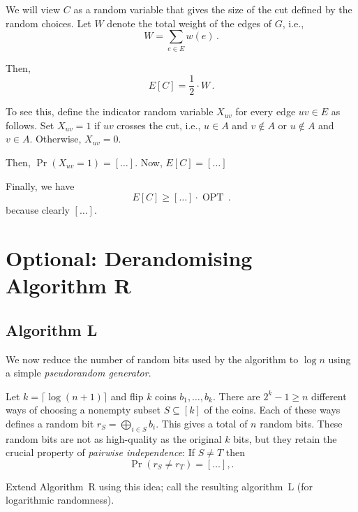 \documentclass{tufte-handout}
\begin{document}
We will view $C$ as a random variable that gives the size of the cut
defined by the random choices.
Let $W$ denote the total weight of the edges of $G$, i.e.,
\[ W= \sum_{e\in E} w(e)\,.\]

Then,
\begin{equation}\label{eq: E[C]}
E[C] = \textstyle\frac{1}{2}\cdot W\,.
\end{equation}

To see this, define the indicator random variable $X_{uv}$ for every
edge $uv\in E$ as follows.
Set $X_{uv}=1$ if $uv$ crosses the cut, i.e., $u\in A$ and $v\notin A$
or $u\notin A$ and $v\in A$.
Otherwise, $X_{uv} = 0$.

Then, $\Pr(X_{uv} = 1) = [\ldots]$.
Now, $E[C]=[\ldots]$ 

\bigskip

Finally, we have
\begin{equation}
E[C] \geq  [\ldots]\cdot \operatorname{OPT}\,.
\end{equation}
because clearly $[\ldots]$.


\newpage
\section{Optional: Derandomising Algorithm R}

\subsection{Algorithm L} 


We now reduce the number of random bits used by the algorithm to $\log
n$ using a simple \emph{pseudorandom generator}.


Let $k=\lceil\log (n+1)\rceil$ and flip $k$ coins $b_1,\ldots, b_k$.
There are $2^k -1 \geq n$ different ways of choosing a nonempty subset
$S\subseteq [k]$ of the coins.
Each of these ways defines a random bit $r_S =\bigoplus_{i\in S} b_i$.
This gives a total of $n$ random bits.
These random bits are not as high-quality as the original $k$ bits,
but they retain the crucial property of \emph{pairwise independence}:
If $S\neq T$ then 
\[ \Pr(r_S\neq r_T) = [\ldots],.\]

Extend Algorithm~R using this idea; call the resulting
algorithm~L (for logarithmic randomness).
\end{document}
